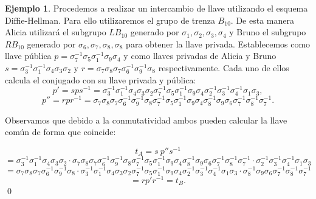 \documentclass[12pt]{book}
\theoremstyle{definition}
\newtheorem{ejem}{Ejemplo}[section]
\begin{document}
\begin{ejem}
Procedemos a realizar un intercambio de llave utilizando el esquema Diffie-Hellman. Para ello utilizaremos el grupo de trenza $B_{10}$. De esta manera Alicia utilizará el subgrupo $LB_{10}$ generado por $\sigma_1,\sigma_2,\sigma_3,\sigma_4$ y Bruno el subgrupo $RB_{10}$ generado por $\sigma_6,\sigma_7,\sigma_8,\sigma_8$ para obtener la llave privada. Establecemos como llave pública $p=\sigma_7^{-1}\sigma_5\sigma_1^{-1}\sigma_9\sigma_4$ y como llaves privadas de Alicia y Bruno $s = \sigma_3^{-1}\sigma_1^{-1}\sigma_4\sigma_3\sigma_2$ y $r = \sigma_7\sigma_8\sigma_7\sigma_6^{-1}\sigma_9^{-1}\sigma_8$ respectivamente. Cada uno de ellos calcula el conjugado con su llave privada y pública:
$$p' = sps^{-1}=\sigma_3^{-1}\sigma_1^{-1}\sigma_4\sigma_3\sigma_2 \sigma_7^{-1}\sigma_5\sigma_1^{-1}\sigma_9\sigma_4 \sigma_2^{-1}\sigma_3^{-1}\sigma_4^{-1}\sigma_1\sigma_3,$$
$$p'' = rpr^{-1} = \sigma_7\sigma_8\sigma_7\sigma_6^{-1}\sigma_9^{-1}\sigma_8 \sigma_7^{-1}\sigma_5\sigma_1^{-1}\sigma_9\sigma_4 \sigma_8^{-1}\sigma_9\sigma_6\sigma_7^{-1}\sigma_8^{-1}\sigma_7^{-1}.$$


Observamos que debido a la conmutatividad ambos pueden calcular la llave común de forma que coincide:

$$t_A = s\ p''s^{-1} $$$$= \sigma_3^{-1}\sigma_1^{-1}\sigma_4\sigma_3\sigma_2\cdot \sigma_7\sigma_8\sigma_7\sigma_6^{-1}\sigma_9^{-1}\sigma_8 \sigma_7^{-1}\sigma_5\sigma_1^{-1}\sigma_9\sigma_4 \sigma_8^{-1}\sigma_9\sigma_6\sigma_7^{-1}\sigma_8^{-1}\sigma_7^{-1}\cdot\sigma_2^{-1}\sigma_3^{-1}\sigma_4^{-1}\sigma_1\sigma_3$$
$$=\sigma_7\sigma_8\sigma_7\sigma_6^{-1}\sigma_9^{-1}\sigma_8\cdot \sigma_3^{-1}\sigma_1^{-1}\sigma_4\sigma_3\sigma_2 \sigma_7^{-1}\sigma_5\sigma_1^{-1}\sigma_9\sigma_4 \sigma_2^{-1}\sigma_3^{-1}\sigma_4^{-1}\sigma_1\sigma_3\cdot
\sigma_8^{-1}\sigma_9\sigma_6\sigma_7^{-1}\sigma_8^{-1}\sigma_7^{-1} $$
$$= rp'r^{-1} = t_B.$$ \qed
\end{ejem}
\end{document}
